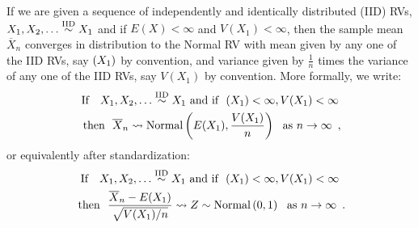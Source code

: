 \begin{prop}\label{P:CLT}

If we are given a sequence of independently and identically distributed (IID) RVs, $X_1,X_2,\ldots \overset{{\rm IID}}{\sim} X_1$ and if $E(X) < \infty$ and $V(X_1)<\infty$, then the sample mean $\overline{X}_n$ converges in 
distribution to the Normal RV with mean given by any one of the IID RVs, say $\mathscr{(}X_1)$ by convention, and variance given by $\frac{1}{n}$ times the variance of any one of the IID RVs, say $V(X_1)$ by convention.  More formally, we write:
\begin{multline}\label{E:CLT}
\text{If} \quad X_1,X_2,\ldots \overset{\IID}{\sim} X_1 \ \text{and if } \ \E(X_1)<\infty, V(X_1) < \infty \\ \text{ then } \ \overline{X}_n \rightsquigarrow \normal\left(E(X_1), \frac{V(X_1)}{n}\right) \ \text{ as } n\to\infty \enspace ,
\end{multline}
or equivalently after standardization:
\begin{multline}\label{E:CLTStd}
\text{If} \quad X_1,X_2,\ldots \overset{\IID}{\sim} X_1 \ \text{and if } \ \E(X_1)<\infty, V(X_1) < \infty \\ \text{ then } \ \frac{\overline{X}_n - E(X_1)}{\sqrt{V(X_1)/n}} \rightsquigarrow Z \sim \normal\left(0,1 \right) \ \text{ as } n\to\infty \enspace .
\end{multline}


\end{prop}
